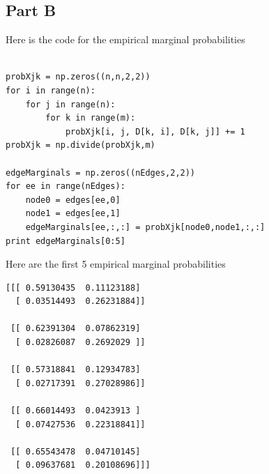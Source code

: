 \documentclass[twoside,11pt]{article}
\theoremstyle{definition}
\begin{document}
\newpage

\subsection*{Part B}

Here is the code for the empirical marginal probabilities
\begin{lstlisting}

probXjk = np.zeros((n,n,2,2))
for i in range(n):
    for j in range(n):
        for k in range(m):
            probXjk[i, j, D[k, i], D[k, j]] += 1
probXjk = np.divide(probXjk,m)

edgeMarginals = np.zeros((nEdges,2,2))
for ee in range(nEdges):
    node0 = edges[ee,0]
    node1 = edges[ee,1]
    edgeMarginals[ee,:,:] = probXjk[node0,node1,:,:]
print edgeMarginals[0:5]

\end{lstlisting}

Here are the first 5 empirical marginal probabilities

\begin{lstlisting}
[[[ 0.59130435  0.11123188]
  [ 0.03514493  0.26231884]]

 [[ 0.62391304  0.07862319]
  [ 0.02826087  0.2692029 ]]

 [[ 0.57318841  0.12934783]
  [ 0.02717391  0.27028986]]

 [[ 0.66014493  0.0423913 ]
  [ 0.07427536  0.22318841]]

 [[ 0.65543478  0.04710145]
  [ 0.09637681  0.20108696]]]
\end{lstlisting}
\newpage
\end{document}
